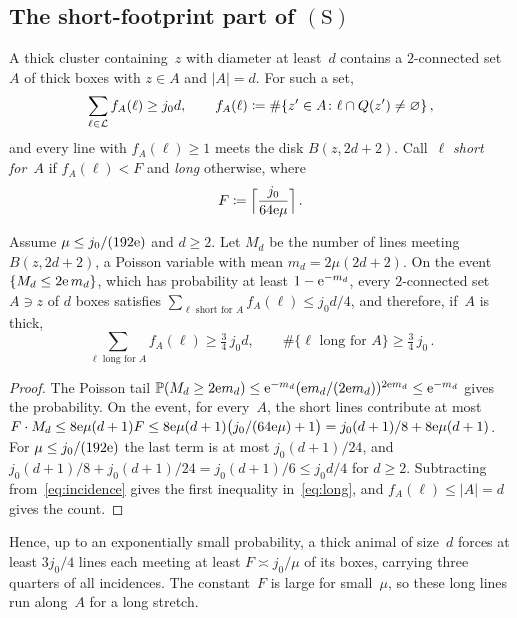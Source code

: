 \documentclass[11pt,letterpaper]{article}
\begin{document}
\subsection{The short-footprint part of $\mathrm{(S)}$}
\label{sec:short}

A thick cluster containing~$z$ with diameter at least~$d$ contains a $2$-connected set~$A$ of thick boxes with $z\in A$ and $\lvert A\rvert=d$. For such a set,
\begin{equation}
\label{eq:incidence}
  \sum_{\ell\in\mathcal L}f_A(\ell)\ge j_0d,\qquad f_A(\ell)\coloneqq\#\{z'\in A\colon\ell\cap Q(z')\neq\varnothing\}\,,
\end{equation}
and every line with $f_A(\ell)\ge1$ meets the disk $B(z,2d+2)$. Call~$\ell$ \emph{short for~$A$} if $f_A(\ell)<F$ and \emph{long} otherwise, where
\begin{equation}
\label{eq:F}
  F\coloneqq\Bigl\lceil\frac{j_0}{64\mathrm{e}\mu}\Bigr\rceil\,.
\end{equation}

\begin{lemma}
\label{lem:short}
Assume $\mu\le j_0/(192\mathrm{e})$ and $d\ge2$. Let $M_d$ be the number of lines meeting $B(z,2d+2)$, a Poisson variable with mean $m_d=2\mu(2d+2)$. On the event $\{M_d\le2\mathrm{e}\,m_d\}$, which has probability at least $1-\mathrm{e}^{-m_d}$, every $2$-connected set~$A\ni z$ of $d$ boxes satisfies $\sum_{\ell\text{ short for }A}f_A(\ell)\le j_0d/4$, and therefore, if~$A$ is thick,
\begin{equation}
\label{eq:long}
  \sum_{\ell\text{ long for }A}f_A(\ell)\ge\tfrac34\,j_0d,\qquad\#\{\ell\text{ long for }A\}\ge\tfrac34\,j_0\,.
\end{equation}
\end{lemma}

\begin{proof}
The Poisson tail $\mathbb P(M_d\ge2\mathrm{e} m_d)\le\mathrm{e}^{-m_d}(\mathrm{e} m_d/(2\mathrm{e} m_d))^{2\mathrm{e} m_d}\le\mathrm{e}^{-m_d}$ gives the probability. On the event, for every~$A$, the short lines contribute at most $F\cdot M_d\le8\mathrm{e}\mu(d+1)F\le8\mathrm{e}\mu(d+1)\bigl(j_0/(64\mathrm{e}\mu)+1\bigr)=j_0(d+1)/8+8\mathrm{e}\mu(d+1)$. For $\mu\le j_0/(192\mathrm{e})$ the last term is at most $j_0(d+1)/24$, and $j_0(d+1)/8+j_0(d+1)/24=j_0(d+1)/6\le j_0d/4$ for $d\ge2$. Subtracting from~\eqref{eq:incidence} gives the first inequality in~\eqref{eq:long}, and $f_A(\ell)\le\lvert A\rvert=d$ gives the count.
\end{proof}

Hence, up to an exponentially small probability, a thick animal of size~$d$ forces at least $3j_0/4$ lines each meeting at least $F\asymp j_0/\mu$ of its boxes, carrying three quarters of all incidences. The constant~$F$ is large for small~$\mu$, so these long lines run along~$A$ for a long stretch.
\end{document}
